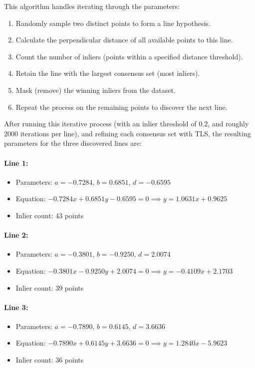 \documentclass[12pt]{article}
\begin{document}
This algorithm handles iterating through the parameters:
\begin{enumerate}
    \item Randomly sample two distinct points to form a line hypothesis.
    \item Calculate the perpendicular distance of all available points to this line.
    \item Count the number of inliers (points within a specified distance threshold).
    \item Retain the line with the largest consensus set (most inliers).
    \item Mask (remove) the winning inliers from the dataset.
    \item Repeat the process on the remaining points to discover the next line.
\end{enumerate}

After running this iterative process (with an inlier threshold of $0.2$, and roughly 2000 iterations per line), and refining each consensus set with TLS, the resulting parameters for the three discovered lines are:

\paragraph{Line 1:}
\begin{itemize}
    \item Parameters: $a = -0.7284$, $b = 0.6851$, $d = -0.6595$
    \item Equation: $-0.7284x + 0.6851y - 0.6595 = 0 \implies y = 1.0631x + 0.9625$
    \item Inlier count: $43$ points
\end{itemize}

\paragraph{Line 2:}
\begin{itemize}
    \item Parameters: $a = -0.3801$, $b = -0.9250$, $d = 2.0074$
    \item Equation: $-0.3801x - 0.9250y + 2.0074 = 0 \implies y = -0.4109x + 2.1703$
    \item Inlier count: $39$ points
\end{itemize}

\paragraph{Line 3:}
\begin{itemize}
    \item Parameters: $a = -0.7890$, $b = 0.6145$, $d = 3.6636$
    \item Equation: $-0.7890x + 0.6145y + 3.6636 = 0 \implies y = 1.2840x - 5.9623$
    \item Inlier count: $36$ points
\end{itemize}
\end{document}
